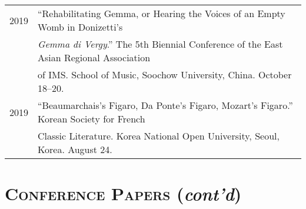 \documentclass[a4paper,11pt]{article}
\begin{document}
  \hspace*{-0.25cm}
  \begin{tabular}{p{2.5cm} p{12.5cm}}
  2019 & “Rehabilitating Gemma, or Hearing the Voices of an Empty Womb in Donizetti’s\\
  & \textit{Gemma di Vergy}.” The 5th Biennial Conference of the East Asian Regional Association\\
  & of IMS. School of Music, Soochow University, China. October 18–20.\\[2mm]
  
  2019 & “Beaumarchais’s Figaro, Da Ponte’s Figaro, Mozart’s Figaro.” Korean Society for French\\
  & Classic Literature. Korea National Open University, Seoul, Korea. August 24.\\[2mm]
  \end{tabular}
  
  \section*{\textsc{Conference Papers} (\textit{cont'd})}
  
\end{document}
